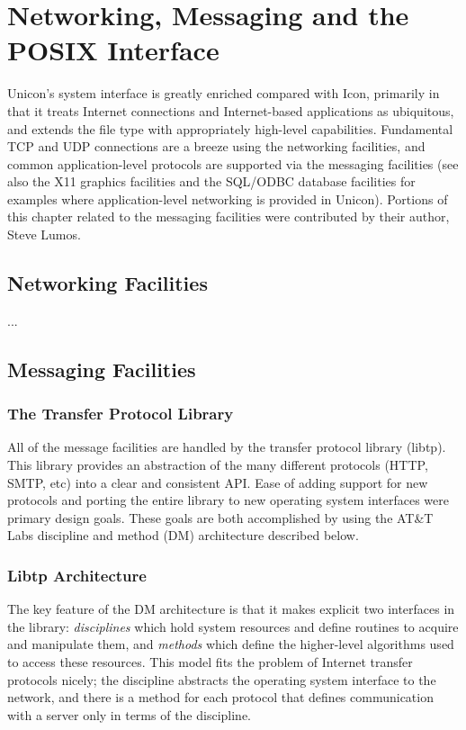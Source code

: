\chapter{Networking, Messaging and the POSIX Interface}

Unicon's system interface is greatly enriched compared with Icon,
primarily in that it treats Internet connections and Internet-based
applications as ubiquitous, and extends the file type with
appropriately high-level capabilities.  Fundamental TCP and UDP
connections are a breeze using the networking facilities, and common
application-level protocols are supported via the messaging facilities
(see also the X11 graphics facilities and the SQL/ODBC database
facilities for examples where application-level networking is provided
in Unicon). Portions of this chapter related to the messaging
facilities were contributed by their author, Steve Lumos.

\section{Networking Facilities}

...

\section{Messaging Facilities}
\subsection{The Transfer Protocol Library}

All of the message facilities are handled by the transfer protocol
library (libtp). This library provides an abstraction of the many
different protocols (HTTP, SMTP, etc) into a clear and consistent
API. Ease of adding support for new protocols and porting the entire
library to new operating system interfaces were primary design
goals. These goals are both accomplished by using the AT\&T Labs
discipline and method (DM) architecture described below.

\subsection{Libtp Architecture}

The key feature of the DM architecture is that it makes explicit two
interfaces in the library: \textit{disciplines} which hold system
resources and define routines to acquire and manipulate them, and
\textit{methods} which define the higher-level algorithms used to
access these resources. This model fits the problem of Internet
transfer protocols nicely; the discipline abstracts the operating
system interface to the network, and there is a method for each
protocol that defines communication with a server only in terms of the
discipline.

